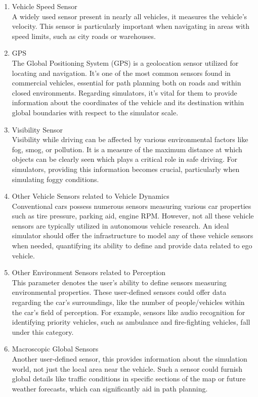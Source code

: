 \documentclass[12pt,twoside,a4paper,parskip]{scrbook} %
\begin{document}
\begin{enumerate}[label=\alph*.]
    \item Vehicle Speed Sensor\\
    A widely used sensor present in nearly all vehicles, it measures the vehicle's velocity. This sensor is particularly important when navigating in areas with speed limits, such as city roads or warehouses.

    \item GPS \\
    The Global Positioning System (GPS) is a geolocation sensor utilized for locating and navigation. It's one of the most common sensors found in commercial vehicles, essential for path planning both on roads and within closed environments. Regarding simulators, it's vital for them to provide information about the coordinates of the vehicle and its destination within global boundaries with respect to the simulator scale.

    \item Visibility Sensor\\
    Visibility while driving can be affected by various environmental factors like fog, smog, or pollution. It is a measure of the maximum distance at which objects can be clearly seen which plays a critical role in safe driving. For simulators, providing this information becomes crucial, particularly when simulating foggy conditions. 

    \item Other Vehicle Sensors related to Vehicle Dynamics \\
    Conventional cars possess numerous sensors measuring various car properties such as tire pressure, parking aid, engine RPM. However, not all these vehicle sensors are typically utilized in autonomous vehicle research. An ideal simulator should offer the infrastructure to model any of these vehicle sensors when needed, quantifying its ability to define and provide data related to ego vehicle.
    
    \item Other Environment Sensors related to Perception \\
    This parameter denotes the user's ability to define sensors measuring environmental properties. These user-defined sensors could offer data regarding the car's surroundings, like the number of people/vehicles within the car's field of perception. For example, sensors like audio recognition for identifying priority vehicles, such as ambulance and fire-fighting vehicles, fall under this category.
    
    \item Macroscopic Global Sensors \\
    Another user-defined sensor, this provides information about the simulation world, not just the local area near the vehicle. Such a sensor could furnish global details like traffic conditions in specific sections of the map or future weather forecasts, which can significantly aid in path planning.    
\end{enumerate}
\end{document}
